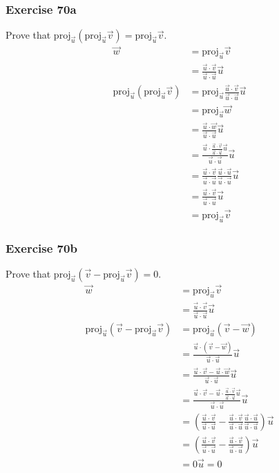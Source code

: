 \documentclass{math}
\begin{document}
\subsubsection*{Exercise 70a}
Prove that \( \text{proj}_{\vec{u}}(\text{proj}_{\vec{u}}\vec{v}) =
\text{proj}_{\vec{u}}\vec{v} \).
\begin{align*}
  \vec{w} &= \text{proj}_{\vec{u}}\vec{v} \\
  &= \frac{\vec{u}\cdot\vec{v}}{\vec{u}\cdot\vec{u}}\vec{u} \\
  \text{proj}_{\vec{u}}(\text{proj}_{\vec{u}}\vec{v}) &= \text{proj}_{\vec{u}}
    \frac{\vec{u}\cdot\vec{v}}{\vec{u}\cdot\vec{u}}\vec{u} \\
  &= \text{proj}_{\vec{u}}\vec{w} \\
  &= \frac{\vec{u}\cdot\vec{w}}{\vec{u}\cdot\vec{u}}\vec{u} \\
  &= \frac{\vec{u}\cdot\frac{\vec{u}\cdot\vec{v}}{\vec{u}\cdot\vec{u}}\vec{u}}
    {\vec{u}\cdot\vec{u}}\vec{u} \\
  &= \frac{\vec{u}\cdot\vec{v}}{\vec{u}\cdot\vec{u}}
    \frac{\vec{u}\cdot\vec{u}}{\vec{u}\cdot\vec{u}}\vec{u} \\
  &= \frac{\vec{u}\cdot\vec{v}}{\vec{u}\cdot\vec{u}}\vec{u} \\
  &= \text{proj}_{\vec{u}}\vec{v}
\end{align*}

\subsubsection*{Exercise 70b}
Prove that \( \text{proj}_{\vec{u}}(\vec{v}-
\text{proj}_{\vec{u}}\vec{v}) = 0 \).
\begin{align*}
  \vec{w} &= \text{proj}_{\vec{u}}\vec{v} \\
  &= \frac{\vec{u}\cdot\vec{v}}{\vec{u}\cdot\vec{u}}\vec{u} \\
  \text{proj}_{\vec{u}}(\vec{v}-\text{proj}_{\vec{u}}\vec{v}) &=
    \text{proj}_{\vec{u}}(\vec{v}-\vec{w}) \\
  &= \frac{\vec{u}\cdot(\vec{v}-\vec{w})}{\vec{u}\cdot\vec{u}}\vec{u} \\
  &= \frac{\vec{u}\cdot\vec{v}-\vec{u}\cdot\vec{w}}
    {\vec{u}\cdot\vec{u}}\vec{u} \\
  &= \frac{\vec{u}\cdot\vec{v}-\vec{u}\cdot
    \frac{\vec{u}\cdot\vec{v}}{\vec{u}\cdot\vec{u}}\vec{u}}
    {\vec{u}\cdot\vec{u}}\vec{u} \\
  &= \left(\frac{\vec{u}\cdot\vec{v}}{\vec{u}\cdot\vec{u}}-
    \frac{\vec{u}\cdot\vec{v}}{\vec{u}\cdot\vec{u}}
    \frac{\vec{u}\cdot\vec{u}}{\vec{u}\cdot\vec{u}}\right)\vec{u} \\
  &= \left(\frac{\vec{u}\cdot\vec{v}}{\vec{u}\cdot\vec{u}}-
    \frac{\vec{u}\cdot\vec{v}}{\vec{u}\cdot\vec{u}}\right)\vec{u} \\
  &= 0\vec{u} = 0
\end{align*}
\end{document}
